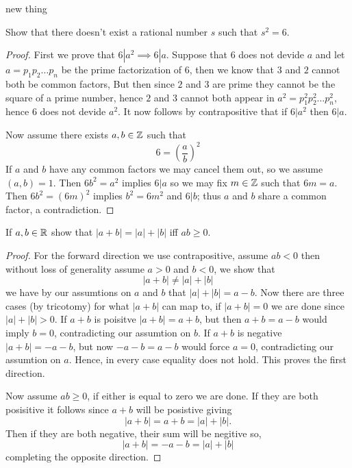 

\maketitle

\question 
new thing

\question
Show that there doesn't exist a rational number $s$ such that $s^2 = 6$. 


\begin{proof}
    First we prove that $6|a^2 \implies 6|a$. Suppose that $6$ does not devide $a$ and let $a = p_1p_2 \dots p_n$ 
    be the prime factorization of $6$, then we know that $3$ and $2$ cannot both be common factors,  
    But then since $2$ and $3$ are prime they cannot be the square of a prime number, hence $2$ and $3$ cannot both 
    appear in $a^2 = p_1^2 p_2^2 \dots p_n^2$, hence $6$ does not devide $a^2$. It now follows by contrapositive that 
    if $6|a^2$ then $6|a$. 

    Now assume there exists $a, b \in \mathbb{Z}$ such that 
    \[6 = \left(\frac{a}{b}\right)^2 \]
    If $a$ and $b$ have any common factors we may cancel them out, so we assume $(a, b) = 1$. 
    Then $6b^2 = a^2$ implies $6|a$ so we may fix $m \in \mathbb{Z}$ such that $6m = a$. Then 
    $6b^2 = (6m)^2$ implies $b^2 = 6m^2$ and $6|b$; thus $a$ and $b$ share a common factor, 
    a contradiction. 

\end{proof}

\question
If $a, b \in \mathbb{R}$ show that $|a + b| = |a| + |b| $ iff $ab \geq 0$. 


\begin{proof}
    For the forward direction we use contrapositive, assume $ab < 0$ then without loss of generality assume $a > 0$ and $b<0$, we show that 
    \[|a +b | \neq |a| + |b| \] 
    we have by our assumtions on $a$ and $b$ that $|a| + |b| = a - b$. 
    Now there are three cases (by tricotomy) for what $|a+b|$ can map to, if $|a + b| = 0$
    we are done since $| a| + |b| > 0$. 
    If $a + b$ is poisitve $|a + b| = a + b$, but then $a + b = a - b$ would imply $b = 0$, contradicting our assumtion on $b$.
    If $a + b$ is negative $|a + b| = -a -b$, but now $-a -b = a - b$ would force $a = 0$, contradicting our assumtion on $a$. 
    Hence, in every case equality does not hold. This proves the first direction.
    
    Now assume $ab \geq 0$, if either is equal to zero we are done. If they are both posisitive it follows since $a + b$ will be posistive giving 
    \[|a + b| = a + b = |a| + |b|.\]
    Then if they are both negative, their sum will be negitive so,
    \[|a + b| = -a - b = |a| + |b|\]
    completing the opposite direction. 
\end{proof}

